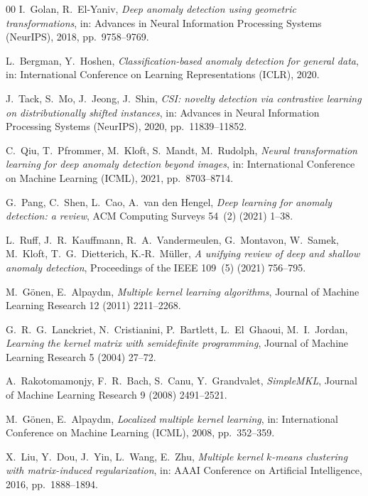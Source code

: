 \documentclass[times, review, 10pt]{elsarticle}
\begin{document}
\begin{thebibliography}{00}
I.~Golan, R.~El-Yaniv,
\textit{Deep anomaly detection using geometric transformations},
in: Advances in Neural Information Processing Systems (NeurIPS), 2018,
pp.\ 9758--9769.

L.~Bergman, Y.~Hoshen,
\textit{Classification-based anomaly detection for general data},
in: International Conference on Learning Representations (ICLR), 2020.

J.~Tack, S.~Mo, J.~Jeong, J.~Shin,
\textit{CSI: novelty detection via contrastive learning on distributionally
shifted instances},
in: Advances in Neural Information Processing Systems (NeurIPS), 2020,
pp.\ 11839--11852.

C.~Qiu, T.~Pfrommer, M.~Kloft, S.~Mandt, M.~Rudolph,
\textit{Neural transformation learning for deep anomaly detection beyond
images},
in: International Conference on Machine Learning (ICML), 2021, pp.\ 8703--8714.

G.~Pang, C.~Shen, L.~Cao, A.~van den Hengel,
\textit{Deep learning for anomaly detection: a review},
ACM Computing Surveys 54~(2) (2021) 1--38.

L.~Ruff, J.~R.~Kauffmann, R.~A.~Vandermeulen, G.~Montavon, W.~Samek,
M.~Kloft, T.~G.~Dietterich, K.-R.~M\"uller,
\textit{A unifying review of deep and shallow anomaly detection},
Proceedings of the IEEE 109~(5) (2021) 756--795.

M.~G\"onen, E.~Alpayd{\i}n,
\textit{Multiple kernel learning algorithms},
Journal of Machine Learning Research 12 (2011) 2211--2268.

G.~R.~G.~Lanckriet, N.~Cristianini, P.~Bartlett, L.~El~Ghaoui, M.~I.~Jordan,
\textit{Learning the kernel matrix with semidefinite programming},
Journal of Machine Learning Research 5 (2004) 27--72.

A.~Rakotomamonjy, F.~R.~Bach, S.~Canu, Y.~Grandvalet,
\textit{SimpleMKL},
Journal of Machine Learning Research 9 (2008) 2491--2521.

M.~G\"onen, E.~Alpayd{\i}n,
\textit{Localized multiple kernel learning},
in: International Conference on Machine Learning (ICML), 2008, pp.\ 352--359.

X.~Liu, Y.~Dou, J.~Yin, L.~Wang, E.~Zhu,
\textit{Multiple kernel $k$-means clustering with matrix-induced
regularization},
in: AAAI Conference on Artificial Intelligence, 2016, pp.\ 1888--1894.


\end{thebibliography}
\end{document}
